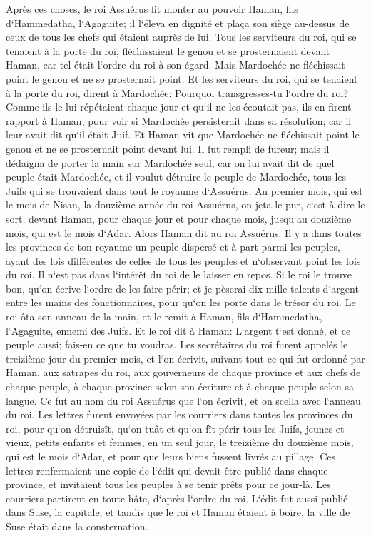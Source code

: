\verse Après ces choses, le roi Assuérus fit monter au pouvoir Haman, fils d`Hammedatha, l`Agaguite; il l`éleva en dignité et plaça son siège au-dessus de ceux de tous les chefs qui étaient auprès de lui. 
\verse Tous les serviteurs du roi, qui se tenaient à la porte du roi, fléchissaient le genou et se prosternaient devant Haman, car tel était l`ordre du roi à son égard. Mais Mardochée ne fléchissait point le genou et ne se prosternait point. 
\verse Et les serviteurs du roi, qui se tenaient à la porte du roi, dirent à Mardochée: Pourquoi transgresses-tu l`ordre du roi? 
\verse Comme ils le lui répétaient chaque jour et qu`il ne les écoutait pas, ils en firent rapport à Haman, pour voir si Mardochée persisterait dans sa résolution; car il leur avait dit qu`il était Juif. 
\verse Et Haman vit que Mardochée ne fléchissait point le genou et ne se prosternait point devant lui. Il fut rempli de fureur; 
\verse mais il dédaigna de porter la main sur Mardochée seul, car on lui avait dit de quel peuple était Mardochée, et il voulut détruire le peuple de Mardochée, tous les Juifs qui se trouvaient dans tout le royaume d`Assuérus. 
\verse Au premier mois, qui est le mois de Nisan, la douzième année du roi Assuérus, on jeta le pur, c`est-à-dire le sort, devant Haman, pour chaque jour et pour chaque mois, jusqu`au douzième mois, qui est le mois d`Adar. 
\verse Alors Haman dit au roi Assuérus: Il y a dans toutes les provinces de ton royaume un peuple dispersé et à part parmi les peuples, ayant des lois différentes de celles de tous les peuples et n`observant point les lois du roi. Il n`est pas dans l`intérêt du roi de le laisser en repos. 
\verse Si le roi le trouve bon, qu`on écrive l`ordre de les faire périr; et je pèserai dix mille talents d`argent entre les mains des fonctionnaires, pour qu`on les porte dans le trésor du roi. 
\verse Le roi ôta son anneau de la main, et le remit à Haman, fils d`Hammedatha, l`Agaguite, ennemi des Juifs. 
\verse Et le roi dit à Haman: L`argent t`est donné, et ce peuple aussi; fais-en ce que tu voudras. 
\verse Les secrétaires du roi furent appelés le treizième jour du premier mois, et l`on écrivit, suivant tout ce qui fut ordonné par Haman, aux satrapes du roi, aux gouverneurs de chaque province et aux chefs de chaque peuple, à chaque province selon son écriture et à chaque peuple selon sa langue. Ce fut au nom du roi Assuérus que l`on écrivit, et on scella avec l`anneau du roi. 
\verse Les lettres furent envoyées par les courriers dans toutes les provinces du roi, pour qu`on détruisît, qu`on tuât et qu`on fît périr tous les Juifs, jeunes et vieux, petits enfants et femmes, en un seul jour, le treizième du douzième mois, qui est le mois d`Adar, et pour que leurs biens fussent livrés au pillage. 
\verse Ces lettres renfermaient une copie de l`édit qui devait être publié dans chaque province, et invitaient tous les peuples à se tenir prêts pour ce jour-là. 
\verse Les courriers partirent en toute hâte, d`après l`ordre du roi. L`édit fut aussi publié dans Suse, la capitale; et tandis que le roi et Haman étaient à boire, la ville de Suse était dans la consternation. 

